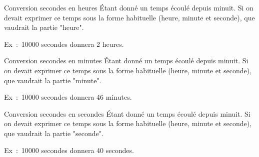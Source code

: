 		\begin{Exercice}{Conversion secondes en heures}
			Étant donné un temps écoulé depuis minuit.
			Si on devait exprimer ce temps sous la forme
			habituelle (heure, minute et seconde),
			que vaudrait la partie "heure".
	
			Ex~:~10000 secondes donnera 2 heures.
		\end{Exercice}
	
		\begin{Exercice}{Conversion secondes en minutes}
			Étant donné un temps écoulé depuis minuit.
			Si on devait exprimer ce temps sous la forme
			habituelle (heure, minute et seconde),
			que vaudrait la partie "minute".
	
			Ex~:~10000 secondes donnera 46 minutes.
		\end{Exercice}
	
		\begin{Exercice}{Conversion secondes en secondes}
			Étant donné un temps écoulé depuis minuit.
			Si on devait exprimer ce temps sous la forme
			habituelle (heure, minute et seconde),
			que vaudrait la partie "seconde".
	
			Ex~:~10000 secondes donnera 40 secondes.
		\end{Exercice}	
		
	
